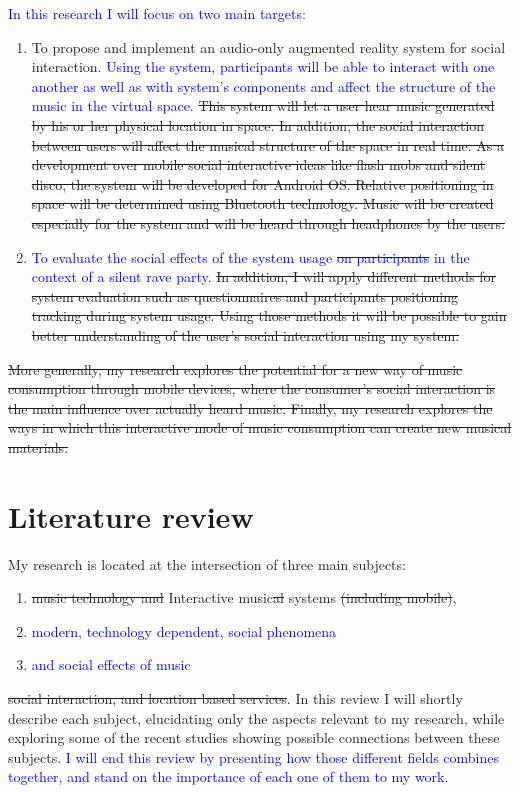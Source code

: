 \documentclass[a4paper,11pt]{article}
\newcommand{\new}[1]{\textcolor{blue}{#1}}
\begin{document}
\new{In this research I will focus on two main targets:}
\begin{enumerate}
	\item To propose and implement an audio-only augmented reality system for social interaction. \new{Using the system, participants will be able to interact with one another as well as with system's components and affect the structure of the music in the virtual space.} \st{This system will let a user hear music generated by his or her physical location in space. In addition, the social interaction between users will affect the musical structure of the space in real time. As a development over mobile social interactive ideas like flash mobs and silent disco, the system will be developed for Android OS. Relative positioning in space will be determined using Bluetooth technology. Music will be created especially for the system and will be heard through headphones by the users.}
	\item \new{To evaluate the social effects of the system usage }\new{\st{on participants}}\new{ in the context of a silent rave party. }\st{In addition, I will apply different methods for system evaluation such as questionnaires and participants positioning tracking during system usage. Using those methods it will be possible to gain better understanding of the user's social interaction using my system.}
\end{enumerate}
\st{More generally, my research explores the potential for a new way of music consumption through mobile devices, where the consumer's social interaction is the main influence over actually heard music. Finally, my research explores the ways in which this interactive mode of music consumption can create new musical materials.}

\section{Literature review}

My research is located at the intersection of three main subjects:
\begin{enumerate}
	\item \st{music technology and} Interactive music\st{al} systems\st{ (including mobile)},
	\item \new{modern, technology dependent, social phenomena}
	\item \new{and social effects of music}
\end{enumerate}
\st{social interaction, and location based services}. In this review I will shortly describe each subject, elucidating only the aspects relevant to my research, while exploring some of the recent studies showing possible connections between these subjects. \new{I will end this review by presenting how those different fields combines together, and stand on the importance of each one of them to my work.}
\end{document}
